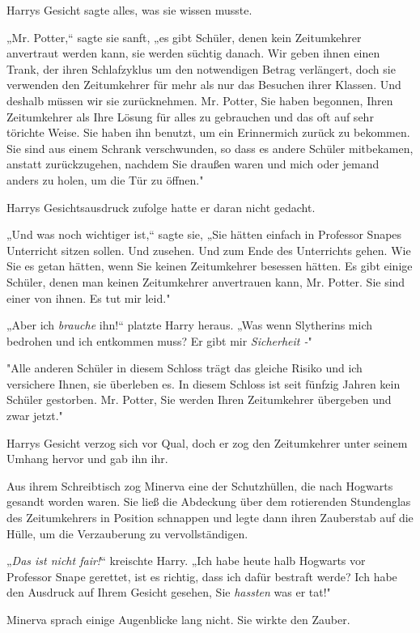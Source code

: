 {Harrys Gesicht sagte alles, was sie wissen musste.

„Mr. Potter,“ sagte sie sanft, „es gibt Schüler, denen kein Zeitumkehrer anvertraut werden kann, sie werden süchtig danach. Wir geben ihnen einen Trank, der ihren Schlafzyklus um den notwendigen Betrag verlängert, doch sie verwenden den Zeitumkehrer für mehr als nur das Besuchen ihrer Klassen. Und deshalb müssen wir sie zurücknehmen. Mr. Potter, Sie haben begonnen, Ihren Zeitumkehrer als Ihre Lösung für alles zu gebrauchen und das oft auf sehr törichte Weise. Sie haben ihn benutzt, um ein Erinnermich zurück zu bekommen. Sie sind aus einem Schrank verschwunden, so dass es andere Schüler mitbekamen, anstatt zurückzugehen, nachdem Sie draußen waren und mich oder jemand anders zu holen, um die Tür zu öffnen."

Harrys Gesichtsausdruck zufolge hatte er daran nicht gedacht.

„Und was noch wichtiger ist,“ sagte sie, „Sie hätten einfach in Professor Snapes Unterricht sitzen sollen. Und zusehen. Und zum Ende des Unterrichts gehen. Wie Sie es getan hätten, wenn Sie keinen Zeitumkehrer besessen hätten. Es gibt einige Schüler, denen man keinen Zeitumkehrer anvertrauen kann, Mr. Potter. Sie sind einer von ihnen. Es tut mir leid."

„Aber ich \emph{brauche} ihn!“ platzte Harry heraus. „Was wenn Slytherins mich bedrohen und ich entkommen muss? Er gibt mir \emph{Sicherheit -}"

"Alle anderen Schüler in diesem Schloss trägt das gleiche Risiko und ich versichere Ihnen, sie überleben es. In diesem Schloss ist seit fünfzig Jahren kein Schüler gestorben. Mr. Potter, Sie werden Ihren Zeitumkehrer übergeben und zwar jetzt."

Harrys Gesicht verzog sich vor Qual, doch er zog den Zeitumkehrer unter seinem Umhang hervor und gab ihn ihr.

Aus ihrem Schreibtisch zog Minerva eine der Schutzhüllen, die nach Hogwarts gesandt worden waren. Sie ließ die Abdeckung über dem rotierenden Stundenglas des Zeitumkehrers in Position schnappen und legte dann ihren Zauberstab auf die Hülle, um die Verzauberung zu vervollständigen.

„\emph{Das ist nicht fair!}“ kreischte Harry. „Ich habe heute halb Hogwarts vor Professor Snape gerettet, ist es richtig, dass ich dafür bestraft werde? Ich habe den Ausdruck auf Ihrem Gesicht gesehen, Sie \emph{hassten} was er tat!"

Minerva sprach einige Augenblicke lang nicht. Sie wirkte den Zauber.

}
